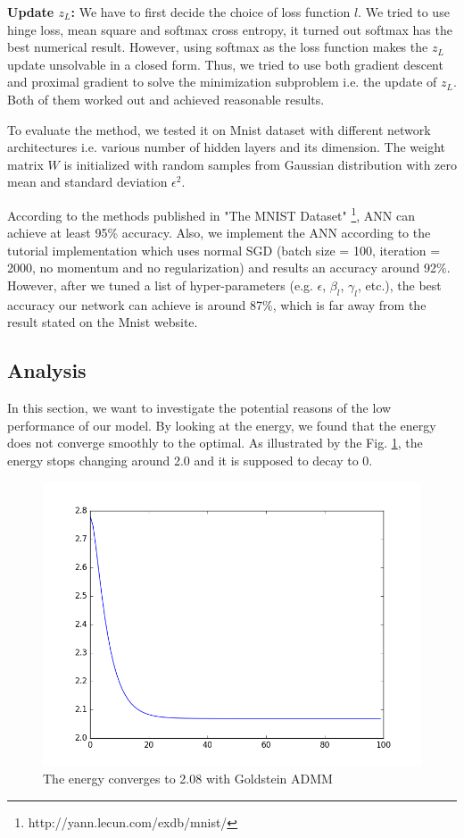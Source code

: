 \documentclass[letterpaper, 10 pt, conference]{ieeeconf}  %
\begin{document}
\textbf{Update $z_L$:  }  We have to first decide the choice of loss function $l$. We tried to use hinge loss, mean square and softmax cross entropy, it turned out softmax has the best numerical result. However, using softmax as the loss function makes the $z_L$ update unsolvable in a closed form. Thus, we tried to use both gradient descent and proximal gradient to solve the minimization subproblem i.e. the update of $z_L$. Both of them worked out and achieved reasonable results. 

To evaluate the method, we tested it on Mnist dataset with different network architectures i.e. various number of hidden layers and its dimension. The weight matrix $W$ is initialized with random samples from Gaussian distribution with zero mean and standard deviation $\epsilon^2$.

According to the methods published in "The MNIST Dataset" \footnote{http://yann.lecun.com/exdb/mnist/}, ANN can achieve at least 95\% accuracy.  Also, we implement the ANN according to the tutorial implementation which uses normal SGD (batch size = 100, iteration = 2000, no momentum and no regularization) and results an accuracy around 92\%. However, after we tuned a list of hyper-parameters (e.g. $\epsilon$, $\beta_l$, $\gamma_l$, etc.),  the best accuracy our network can achieve is around 87\%, which is far away from the result stated on the Mnist website.

\subsection{Analysis}
In this section, we want to investigate the potential reasons of the low performance of our model. By looking at the energy, we found that the energy does not converge smoothly to the optimal. As illustrated by the Fig. \ref{fig:energySame}, the energy stops changing around 2.0 and it is supposed to decay to 0.

\begin{figure}
\centering
\includegraphics[width=\columnwidth]{figure/energy_has_lambda.png}
\caption{The energy converges to 2.08 with Goldstein ADMM}
\label{fig:energySame}
\end{figure}
\end{document}

